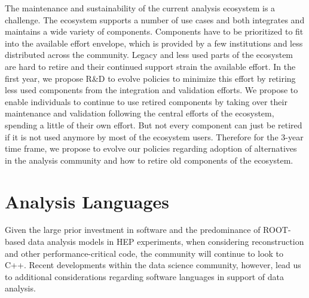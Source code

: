 \documentclass[12pt,a4paper]{article}
\begin{document}
The maintenance and sustainability of the current analysis ecosystem is a challenge. The ecosystem supports a number of use cases and both integrates and maintains a wide variety of components. Components have to be prioritized to fit into the available effort envelope, which is provided by a few institutions and less distributed across the community. Legacy and less used parts of the ecosystem are hard to retire and their continued support strain the available effort. In the first year, we propose R\&D to evolve policies to minimize this effort by retiring less used components from the integration and validation efforts. We propose to enable individuals to continue to use retired components by taking over their maintenance and validation following the central efforts of the ecosystem, spending a little of their own effort. 
But not every component can just be retired if it is not used anymore by most of the ecosystem users. Therefore for the 3-year time frame, we propose to evolve our policies regarding adoption of alternatives in the analysis community and how to retire old components of the ecosystem.

\section{Analysis Languages}

Given the large prior investment in software and the predominance of ROOT-based data analysis models in HEP experiments, when considering reconstruction and other performance-critical code, the community will continue to look to C++. Recent developments within the data science community, however, lead us to additional considerations regarding software languages in support of data analysis.
\end{document}

